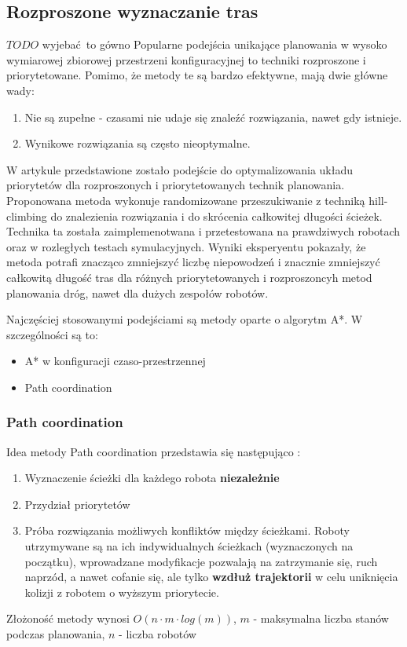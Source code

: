 \subsection{Rozproszone wyznaczanie tras}
$TODO$ wyjebać to gówno
Popularne podejścia unikające planowania w wysoko wymiarowej zbiorowej przestrzeni konfiguracyjnej to techniki rozproszone i priorytetowane.
Pomimo, że metody te są bardzo efektywne, mają dwie główne wady:
\begin{enumerate}
	\item Nie są zupełne - czasami nie udaje się znaleźć rozwiązania, nawet gdy istnieje.
	\item Wynikowe rozwiązania są często nieoptymalne.
\end{enumerate}

W artykule \cite{optpriorities} przedstawione zostało podejście do optymalizowania układu priorytetów dla rozproszonych i priorytetowanych technik planowania.
Proponowana metoda wykonuje randomizowane przeszukiwanie z techniką hill-climbing do znalezienia rozwiązania i do skrócenia całkowitej długości ścieżek.
Technika ta została zaimplemenotwana i przetestowana na prawdziwych robotach oraz w rozległych testach symulacyjnych.
Wyniki eksperyentu pokazały, że metoda potrafi znacząco zmniejszyć liczbę niepowodzeń i znacznie zmniejszyć całkowitą długość tras dla różnych priorytetowanych i rozproszoncyh metod planowania dróg, nawet dla dużych zespołów robotów.

Najczęściej stosowanymi podejściami są metody oparte o algorytm A*. W szczególności są to:
\begin{itemize}
	\item A* w konfiguracji czaso-przestrzennej
	\item Path coordination
\end{itemize}

\subsubsection{Path coordination}
Idea metody Path coordination przedstawia się następująco \cite{optpriorities}:
\begin{enumerate}
	\item Wyznaczenie ścieżki dla każdego robota {\bf niezależnie}
	\item Przydział priorytetów
	\item Próba rozwiązania możliwych konfliktów między ścieżkami. Roboty utrzymywane są na ich indywidualnych ścieżkach (wyznaczonych na początku), wprowadzane modyfikacje pozwalają na zatrzymanie się, ruch naprzód, a nawet cofanie się, ale tylko {\bf wzdłuż trajektorii} w celu uniknięcia kolizji z robotem o wyższym priorytecie.
\end{enumerate}
Złożoność metody wynosi $O(n \cdot m \cdot log(m))$, $m$ - maksymalna liczba stanów podczas planowania, $n$ - liczba robotów


